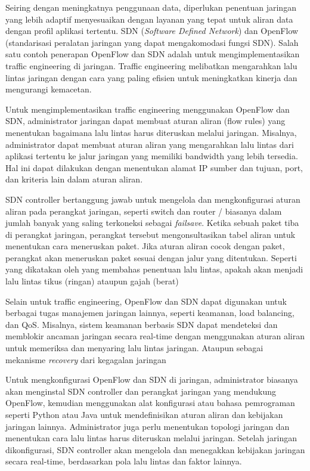 \documentclass{article}
\begin{document}
Seiring dengan meningkatnya penggunaan data, 
diperlukan penentuan jaringan yang lebih adaptif menyesuaikan dengan 
layanan yang tepat untuk aliran data dengan profil aplikasi tertentu. 
SDN (\emph{Software Defined Network}) dan 
OpenFlow (standarisasi peralatan jaringan yang dapat mengakomodasi fungsi SDN).
Salah satu contoh penerapan OpenFlow dan SDN adalah untuk mengimplementasikan traffic engineering di jaringan. Traffic engineering melibatkan mengarahkan lalu lintas jaringan dengan cara yang paling efisien untuk meningkatkan kinerja dan mengurangi kemacetan.

Untuk mengimplementasikan traffic 
engineering menggunakan OpenFlow dan SDN, 
administrator jaringan dapat membuat aturan aliran 
(flow rules) yang menentukan bagaimana lalu lintas 
harus diteruskan melalui jaringan. 
Misalnya, administrator dapat membuat 
aturan aliran yang mengarahkan lalu lintas dari aplikasi tertentu ke jalur jaringan yang memiliki bandwidth yang lebih tersedia. Hal ini dapat dilakukan dengan menentukan alamat IP sumber dan tujuan, port, dan kriteria lain dalam aturan aliran.

SDN controller bertanggung jawab untuk mengelola 
dan mengkonfigurasi aturan aliran pada perangkat jaringan, 
seperti switch dan router / biasanya dalam jumlah banyak yang saling terkoneksi sebagai \emph{failsave}. 
Ketika sebuah paket tiba di perangkat jaringan, 
perangkat tersebut mengonsultasikan tabel aliran untuk menentukan cara meneruskan paket. 
Jika aturan aliran cocok dengan paket, perangkat akan meneruskan paket sesuai dengan jalur yang ditentukan.
Seperti yang dikatakan oleh \cite{shi2020openflow} yang membahas penentuan lalu lintas, apakah akan menjadi lalu lintas tikus (ringan) ataupun gajah (berat)

Selain untuk traffic engineering, 
OpenFlow dan SDN dapat digunakan untuk berbagai tugas manajemen jaringan lainnya, 
seperti keamanan, load balancing, dan QoS. 
Misalnya, sistem keamanan berbasis SDN dapat 
mendeteksi dan memblokir ancaman jaringan secara 
real-time dengan menggunakan aturan aliran untuk memeriksa 
dan menyaring lalu lintas jaringan. Ataupun sebagai mekanisme \emph{recovery} dari kegagalan jaringan \cite{nurwarsito2023implementation}

Untuk mengkonfigurasi OpenFlow dan SDN di jaringan, 
administrator biasanya akan menginstal SDN controller dan perangkat jaringan yang mendukung OpenFlow, 
kemudian menggunakan alat konfigurasi atau bahasa pemrograman seperti Python atau Java 
untuk mendefinisikan aturan aliran dan kebijakan jaringan lainnya. 
Administrator juga perlu menentukan topologi jaringan dan menentukan cara lalu lintas 
harus diteruskan melalui jaringan. Setelah jaringan dikonfigurasi, 
SDN controller akan mengelola dan menegakkan kebijakan jaringan secara real-time, 
berdasarkan pola lalu lintas dan faktor lainnya. 


\end{document}
